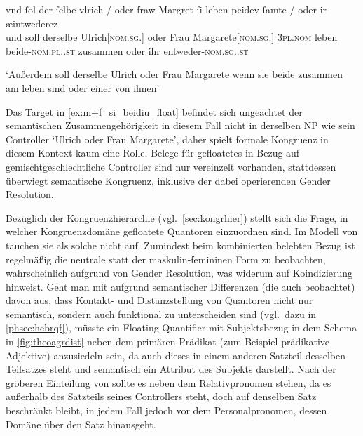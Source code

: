 \begin{exe}
\ex \label{ex:m+f_si_beidiu_float}
	\gll vnd ſol {der ſelbe} vlrich / oder fraw Margret \textelp{}
			ſi leben peidev ſamte / oder ir æintwederez \\
		und soll derselbe Ulrich[\textsc{nom.sg.\MascM}] {} oder Frau
			Margarete[\textsc{nom.sg.\FemF}] {} \textsc{3pl\subMF.nom} leben
			beide-\textsc{nom.pl.\NeutMF.st} zusammen {} oder ihr
			entweder-\textsc{nom.sg.\NeutMF.st} \\
	\begin{taggedline}{\parencites(Brixen, 1298)[\pno~3141~A, 352.3--9]{cao4}}
	\trans `Außerdem soll derselbe Ulrich oder Frau Margarete \textelp{}
		wenn sie beide zusammen am leben sind oder einer von ihnen'
	\end{taggedline}
\end{exe}

Das Target  in \cref{ex:m+f_si_beidiu_float} befindet sich
ungeachtet der semantischen Zusammengehörigkeit in diesem Fall nicht in
derselben NP wie sein Controller  `Ulrich
oder Frau Margarete', daher spielt formale Kongruenz in diesem Kontext kaum
eine Rolle. Belege für gefloatetes  in Bezug auf
gemischtgeschlechtliche Controller sind nur vereinzelt vorhanden, stattdessen
überwiegt semantische Kongruenz, inklusive der dabei operierenden Gender
Resolution.

Bezüglich der Kongruenzhierarchie (vgl.~\cref{sec:kongrhier}) stellt sich die
Frage, in welcher Kongruenzdomäne gefloatete Quantoren einzuordnen sind. Im
Modell von \textcites{corbett1979}[84]{wechslerzlatic2003} tauchen sie als
solche nicht auf. Zumindest beim kombinierten belebten Bezug ist regelmäßig die
neutrale statt der maskulin-femininen Form zu beobachten, wahrscheinlich
aufgrund von Gender Resolution, was widerum auf Koindizierung hinweist. Geht
man mit \citet{spector2009} aufgrund semantischer Differenzen (die auch
\cite{pittner1995} beobachtet) davon aus, dass Kontakt- und Distanzstellung von
Quantoren nicht nur semantisch, sondern auch funktional zu unterscheiden sind
(vgl.~dazu in \cref{phsec:hebrqf}), müsste ein Floating Quantifier mit
Subjektsbezug in dem Schema in \cref{fig:theoagrdist} neben dem primären
Prädikat (zum Beispiel prädikative Adjektive) anzusiedeln sein, da auch dieses
in einem anderen Satzteil desselben Teilsatzes steht und semantisch ein
Attribut des Subjekts darstellt. Nach der gröberen Einteilung von
\citet[216]{corbett1979} sollte es neben dem Relativpronomen stehen, da es
außerhalb des Satzteils seines Controllers steht, doch auf denselben Satz
beschränkt bleibt, in jedem Fall jedoch vor dem Personalpronomen, dessen Domäne
über den Satz hinausgeht.%

